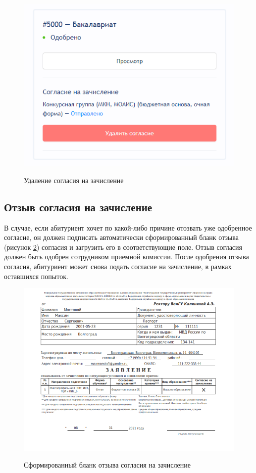 \begin{figure}[H]
\begin{center}
\includegraphics[width=0.7\hsize]{fig/agree-delete.png}\\[2mm]
\caption{Удаление согласия на зачисление}\label{fig:agreedelete}
\end{center}
\end{figure}

\subsection{Отзыв согласия на зачисление}

В случае, если абитуриент хочет по какой-либо причине отозвать уже одобренное согласие, он должен подписать автоматически сформированный бланк отзыва (рисунок \ref{fig:agreecanceldoc}) согласия и загрузить его в соответствующие поле. Отзыв согласия должен быть одобрен сотрудником приемной комиссии. После одобрения отзыва согласия, абитуриент может снова подать согласие на зачисление, в рамках оставшихся попыток.

\begin{figure}[H]
\begin{center}
\includegraphics[width=0.9\hsize]{fig/agree-cancel.png}\\[2mm]
\caption{Сформированный бланк отзыва согласия на зачисление}\label{fig:agreecanceldoc}
\end{center}
\end{figure}

